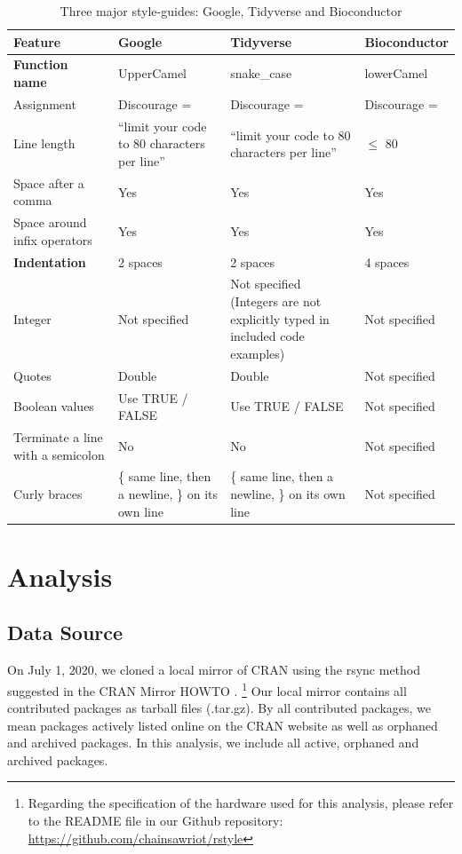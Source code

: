 \begin{table}

\caption{\label{tab:table1}Three major style-guides: Google, Tidyverse and Bioconductor}
\centering
\begin{tabular}[t]{L|L|L|L}
\hline
Feature & Google & Tidyverse & Bioconductor\\
\hline
\textbf{Function name} & UpperCamel & snake\_case & lowerCamel\\
\hline
Assignment & Discourage = & Discourage = & Discourage =\\
\hline
Line length & “limit your code to 80 characters per line” & “limit your code to 80 characters per line” & $\leqslant$ 80\\
\hline
Space after a comma & Yes & Yes & Yes\\
\hline
Space around infix operators & Yes & Yes & Yes\\
\hline
\textbf{Indentation} & 2 spaces & 2 spaces & 4 spaces\\
\hline
Integer & Not specified & Not specified (Integers are not explicitly typed in included code examples) & Not specified\\
\hline
Quotes & Double & Double & Not specified\\
\hline
Boolean values & Use TRUE / FALSE & Use TRUE / FALSE & Not specified\\
\hline
Terminate a line with a semicolon & No & No & Not specified\\
\hline
Curly braces & \{ same line, then a newline, \} on its own line & \{ same line, then a newline, \} on its own line & Not specified\\
\hline
\end{tabular}
\end{table}


\section{Analysis}
\subsection{Data Source}

On July 1, 2020, we cloned a local mirror of CRAN using the rsync method suggested in the CRAN Mirror HOWTO \citep{cranminihowto}. \footnote{Regarding the specification of the hardware used for this analysis, please refer to the README file in our Github repository: \url{https://github.com/chainsawriot/rstyle}} Our local mirror contains all contributed packages as tarball files (.tar.gz). By all contributed packages, we mean packages actively listed online on the CRAN website as well as orphaned and archived packages. In this analysis, we include all active, orphaned and archived packages.

